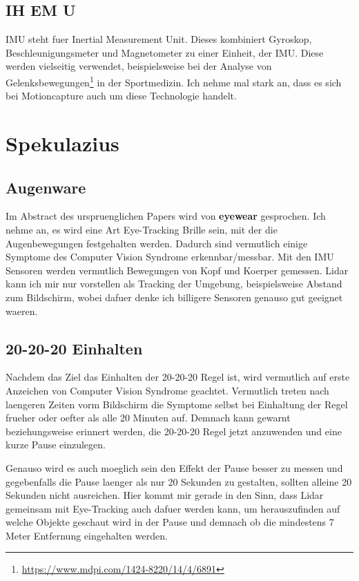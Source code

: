 \subsection{IH EM U}

IMU steht fuer Inertial Measurement Unit. Dieses kombiniert Gyroskop, Beschleunigungsmeter und Magnetometer zu einer Einheit, der IMU.
Diese werden vielseitig verwendet, beispielsweise bei der Analyse von Gelenksbewegungen\footnote{\url{https://www.mdpi.com/1424-8220/14/4/6891}}
in der Sportmedizin. Ich nehme mal stark an, dass es sich bei Motioncapture auch um diese Technologie handelt.

\section{Spekulazius}

\subsection{Augenware}

Im Abstract des urspruenglichen Papers wird von \textbf{eyewear} gesprochen. Ich nehme an, es wird eine Art Eye-Tracking Brille sein, mit der die
Augenbewegungen festgehalten werden. Dadurch sind vermutlich einige Symptome des Computer Vision Syndrome erkennbar/messbar. Mit den IMU Sensoren
werden vermutlich Bewegungen von Kopf und Koerper gemessen. Lidar kann ich mir nur vorstellen als Tracking der Umgebung, 
beispielsweise Abstand zum Bildschirm, wobei dafuer denke ich billigere Sensoren genauso gut geeignet waeren.

\subsection{20-20-20 Einhalten}

Nachdem das Ziel das Einhalten der 20-20-20 Regel ist, wird vermutlich auf erste Anzeichen von Computer Vision Syndrome geachtet. 
Vermutlich treten nach laengeren Zeiten vorm Bildschirm die Symptome selbst bei Einhaltung der Regel frueher oder oefter als alle 20 Minuten auf.
Demnach kann gewarnt beziehungsweise erinnert werden, die 20-20-20 Regel jetzt anzuwenden und eine kurze Pause einzulegen.

Genauso wird es auch moeglich sein den Effekt der Pause besser zu messen und gegebenfalls die Pause laenger als nur 20 Sekunden
zu gestalten, sollten alleine 20 Sekunden nicht ausreichen. Hier kommt mir gerade in den Sinn, dass Lidar gemeinsam mit Eye-Tracking auch 
dafuer werden kann, um herauszufinden auf welche Objekte geschaut wird in der Pause und demnach ob die mindestens 7 Meter Entfernung 
eingehalten werden.

